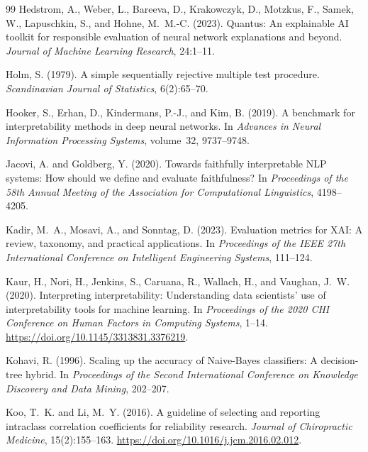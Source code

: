 \documentclass[twoside,11pt]{article}
\begin{document}
\begin{thebibliography}{99}
Hedstrom, A., Weber, L., Bareeva, D., Krakowczyk, D., Motzkus, F.,
Samek, W., Lapuschkin, S., and Hohne, M.~M.-C. (2023).
Quantus: An explainable AI toolkit for responsible evaluation of neural
network explanations and beyond.
\emph{Journal of Machine Learning Research}, 24:1--11.

Holm, S. (1979).
A simple sequentially rejective multiple test procedure.
\emph{Scandinavian Journal of Statistics}, 6(2):65--70.

Hooker, S., Erhan, D., Kindermans, P.-J., and Kim, B. (2019).
A benchmark for interpretability methods in deep neural networks.
In \emph{Advances in Neural Information Processing Systems}, volume~32,
9737--9748.

Jacovi, A. and Goldberg, Y. (2020).
Towards faithfully interpretable {NLP} systems: How should we define and
evaluate faithfulness?
In \emph{Proceedings of the 58th Annual Meeting of the Association for
Computational Linguistics}, 4198--4205.

Kadir, M.~A., Mosavi, A., and Sonntag, D. (2023).
Evaluation metrics for XAI: A review, taxonomy, and practical applications.
In \emph{Proceedings of the IEEE 27th International Conference on
Intelligent Engineering Systems}, 111--124.

Kaur, H., Nori, H., Jenkins, S., Caruana, R., Wallach, H., and
Vaughan, J.~W. (2020).
Interpreting interpretability: Understanding data scientists' use of
interpretability tools for machine learning.
In \emph{Proceedings of the 2020 {CHI} Conference on Human Factors in
Computing Systems}, 1--14.
\url{https://doi.org/10.1145/3313831.3376219}.

Kohavi, R. (1996).
Scaling up the accuracy of Naive-Bayes classifiers: A decision-tree hybrid.
In \emph{Proceedings of the Second International Conference on Knowledge
Discovery and Data Mining}, 202--207.

Koo, T.~K. and Li, M.~Y. (2016).
A guideline of selecting and reporting intraclass correlation coefficients
for reliability research.
\emph{Journal of Chiropractic Medicine}, 15(2):155--163.
\url{https://doi.org/10.1016/j.jcm.2016.02.012}.


\end{thebibliography}
\end{document}
